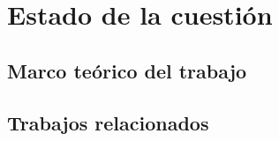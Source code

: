 \chapter{Estado de la cuestión}  

\section{Marco teórico del trabajo}

\section{Trabajos relacionados}
